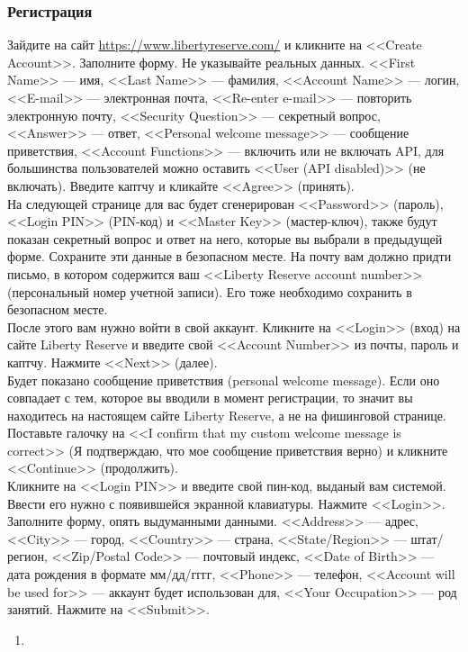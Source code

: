 \subsubsection{Регистрация}
Зайдите на сайт \url{https://www.libertyreserve.com/} и кликните на <<Create Account>>. Заполните форму. Не указывайте реальных данных. <<First Name>> --- имя, <<Last Name>> --- фамилия, <<Account Name>> --- логин, <<E-mail>> --- электронная почта, <<Re-enter e-mail>> --- повторить электронную почту, <<Security Question>> --- секретный вопрос, <<Answer>> --- ответ, <<Personal welcome message>> --- сообщение приветствия, <<Account Functions>> --- включить или не включать API, для большинства пользователей можно оставить <<User (API disabled)>> (не включать). Введите каптчу и кликайте <<Agree>> (принять).\\
На следующей странице для вас будет сгенерирован <<Password>> (пароль), <<Login PIN>> (PIN-код) и <<Master Key>> (мастер-ключ), также будут показан секретный вопрос и ответ на него, которые вы выбрали в предыдущей форме. Сохраните эти данные в безопасном месте. На почту вам должно придти письмо, в котором содержится ваш <<Liberty Reserve account number>> (персональный номер учетной записи). Его тоже необходимо сохранить в безопасном месте.\\
После этого вам нужно войти в свой аккаунт. Кликните на <<Login>> (вход) на сайте Liberty Reserve и введите свой <<Account Number>> из почты, пароль и каптчу. Нажмите <<Next>> (далее).\\
Будет показано сообщение приветствия (personal welcome message). Если оно совпадает с тем, которое вы вводили в момент регистрации, то значит вы находитесь на настоящем сайте Liberty Reserve, а не на фишинговой странице. Поставьте галочку на <<I confirm that my custom welcome message is correct>> (Я подтверждаю, что мое сообщение приветствия верно) и кликните <<Continue>> (продолжить).\\
Кликните на <<Login PIN>> и введите свой пин-код, выданый вам системой. Ввести его нужно с появившейся экранной клавиатуры. Нажмите <<Login>>.\\
Заполните форму, опять выдуманными данными. <<Address>> --- адрес, <<City>> --- город, <<Country>> --- страна, <<State/Region>> --- штат/регион, <<Zip/Postal Code>> --- почтовый индекс, <<Date of Birth>> --- дата рождения в формате мм/дд/гггг, <<Phone>> --- телефон, <<Account will be used for>> --- аккаунт будет использован для, <<Your Occupation>> --- род занятий. Нажмите на <<Submit>>.
\begin{enumerate}
\item 
\end{enumerate}

